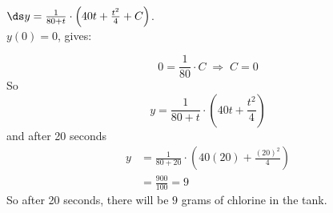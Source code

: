 \begin{frame}

$\ds 
y=\frac{1}{80+t}\cdot\left(40t+\frac{t^2}{4}+C\right)
$. \\ 
$y(0)=0$, gives:                                     

\[
0=\frac{1}{80}\cdot C\;\Rightarrow\; C=0
\]      
\pause So
\[
 y=\frac{1}{80+t}\cdot\left(40t+\frac{t^2}{4}\right)
\]                                     
\pause 
 and after 20 seconds 
\begin{align*}
y& =\frac{1}{80+20}\cdot\left(40(20)+\frac{(20)^2}{4}\right)\\
&=\frac{900}{100}=9
\end{align*} 
\pause                                        
So after 20 seconds, there will be $9$ grams of chlorine in the tank.    

\end{frame}


